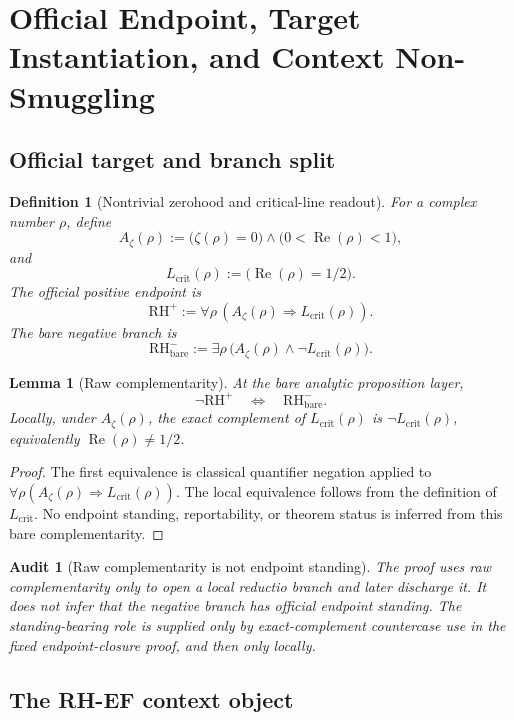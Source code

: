 \documentclass[11pt]{article}
\newtheorem{definition}{Definition}[section]
\newtheorem{lemma}{Lemma}[section]
\newtheorem{audit}{Audit}[section]
\DeclareMathOperator{\Ree}{Re}
\newcommand{\Az}{A_{\zeta}}
\newcommand{\Lcrit}{L_{\mathrm{crit}}}
\newcommand{\RH}{\mathrm{RH}}
\begin{document}
\newpage

\section{Official Endpoint, Target Instantiation, and Context Non-Smuggling}

\subsection{Official target and branch split}

\begin{definition}[Nontrivial zerohood and critical-line readout]
For a complex number \(\rho\), define
\[
\Az(\rho):=\bigl(\zeta(\rho)=0\bigr)\wedge \bigl(0<\Ree(\rho)<1\bigr),
\]
and
\[
\Lcrit(\rho):=\bigl(\Ree(\rho)=1/2\bigr).
\]
The official positive endpoint is
\[
\RH^+ := \forall \rho\, (\Az(\rho)\Rightarrow \Lcrit(\rho)).
\]
The bare negative branch is
\[
\RH^-_{\mathrm{bare}}:=\exists\rho\,\bigl(\Az(\rho)\wedge\neg\Lcrit(\rho)\bigr).
\]
\end{definition}

\begin{lemma}[Raw complementarity]
At the bare analytic proposition layer,
\[
\neg \RH^+\quad\Longleftrightarrow\quad \RH^-_{\mathrm{bare}}.
\]
Locally, under \(\Az(\rho)\), the exact complement of \(\Lcrit(\rho)\) is \(\neg\Lcrit(\rho)\), equivalently \(\Ree(\rho)\ne 1/2\).
\end{lemma}

\begin{proof}
The first equivalence is classical quantifier negation applied to \(\forall \rho(\Az(\rho)\Rightarrow \Lcrit(\rho))\).  The local equivalence follows from the definition of \(\Lcrit\).  No endpoint standing, reportability, or theorem status is inferred from this bare complementarity.
\end{proof}

\begin{audit}[Raw complementarity is not endpoint standing]
The proof uses raw complementarity only to open a local reductio branch and later discharge it.  It does not infer that the negative branch has official endpoint standing.  The standing-bearing role is supplied only by exact-complement countercase use in the fixed endpoint-closure proof, and then only locally.
\end{audit}

\subsection{The RH-EF context object}
\end{document}
